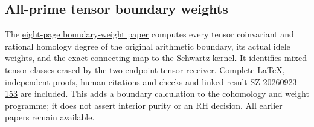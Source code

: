 \documentclass[
]{article}
\begin{document}
\subsection{All-prime tensor boundary
weights}\label{all-prime-tensor-boundary-weights}

The
\href{https://github.com/KokunoYumeto/zeta-function-research-reader/blob/main/workbenches/splitzero-tandem/continuations/20260923-retained-source-readers/all-prime-boundary-weights/ROOT_BOUNDARY_WEIGHT_HOMOLOGY.pdf}{eight-page
boundary-weight paper} computes every tensor coinvariant and rational
homology degree of the original arithmetic boundary, its actual idele
weights, and the exact connecting map to the Schwartz kernel. It
identifies mixed tensor classes erased by the two-endpoint tensor
receiver.
\href{https://github.com/KokunoYumeto/zeta-function-research-reader/blob/main/workbenches/splitzero-tandem/continuations/20260923-retained-source-readers/all-prime-boundary-weights/README.md}{Complete
LaTeX, independent proofs, human citations and checks} and
\href{https://github.com/KokunoYumeto/zeta-function-research-reader/blob/main/workbenches/splitzero-tandem/continuations/20260923-retained-source-readers/all-prime-boundary-weights/RESULT_INDEX.json}{linked
result SZ-20260923-153} are included. This adds a boundary calculation
to the cohomology and weight programme; it does not assert interior
purity or an RH decision. All earlier papers remain available.
\end{document}
